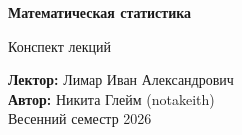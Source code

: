 \begin{titlepage}
\begin{center}

\vspace*{3cm}

{\Huge\bfseries Математическая статистика}

\vspace{0.8cm}
{\large Конспект лекций}

\vspace{2.5cm}

{\normalsize\textbf{Лектор:} Лимар Иван Александрович}\\[0.4cm]
{\normalsize\textbf{Автор:} Никита Глейм (notakeith)}\\[0.4cm]
{\normalsize Весенний семестр 2026}

\end{center}
\end{titlepage}